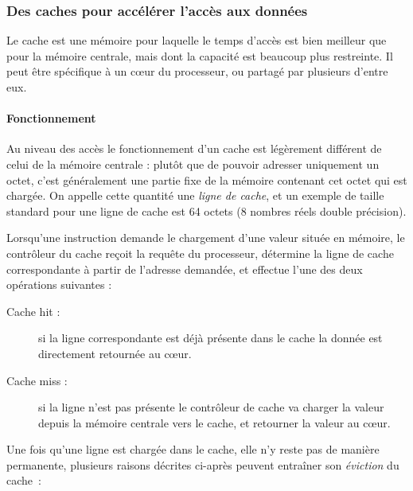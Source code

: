 \subsubsection{Des caches pour accélérer l'accès aux données}\label{sec:context:numa:cache}

Le cache est une mémoire pour laquelle le temps d'accès est bien meilleur que pour la mémoire centrale, mais dont la capacité est beaucoup plus restreinte. Il peut être spécifique à un cœur du processeur, ou partagé par plusieurs d'entre eux.

\paragraph{Fonctionnement}

Au niveau des accès le fonctionnement d'un cache est légèrement différent de celui de la mémoire centrale : plutôt que de pouvoir adresser uniquement un octet, c'est généralement une partie fixe de la mémoire contenant cet octet qui est chargée.
On appelle cette quantité une \emph{ligne de cache}, et un exemple de taille standard pour une ligne de cache est 64 octets (8 nombres réels double précision).

Lorsqu'une instruction demande le chargement d'une valeur située en mémoire, le contrôleur du cache reçoit la requête du processeur, détermine la ligne de cache correspondante à partir de l'adresse demandée, et effectue l'une des deux opérations suivantes :
\begin{description}
  \item [Cache hit :] si la ligne correspondante est déjà présente dans le cache la donnée est directement retournée au cœur.
  \item [Cache miss :] si la ligne n'est pas présente le contrôleur de cache va charger la valeur depuis la mémoire centrale vers le cache, et retourner la valeur au cœur.
\end{description}

Une fois qu'une ligne est chargée dans le cache, elle n'y reste pas de manière permanente, plusieurs raisons décrites ci-après peuvent entraîner son \emph{éviction} du cache~:

